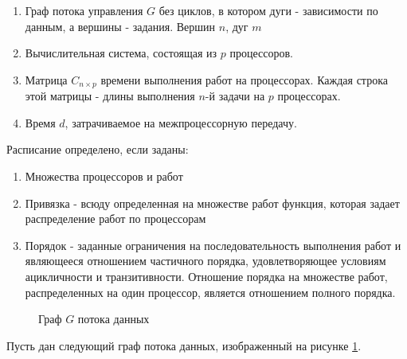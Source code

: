 \begin{enumerate}
    \item Граф потока управления $G$ без циклов, в котором дуги - зависимости по данным, а вершины - задания. Вершин $n$, дуг $m$
    \item Вычислительная система, состоящая из $p$ процессоров.
    \item Матрица $C_{n \times p}$ времени выполнения работ на процессорах. Каждая строка этой матрицы - длины выполнения $n$-й задачи на $p$ процессорах. 
    \item Время $d$, затрачиваемое на межпроцессорную передачу.
\end{enumerate}

Расписание определено, если заданы:
\begin{enumerate}
    \item Множества процессоров и работ
    \item Привязка - всюду определенная на множестве работ функция, которая задает распределение работ по процессорам
    \item Порядок - заданные ограничения на последовательность выполнения работ и являющееся отношением частичного порядка, удовлетворяющее условиям ацикличности и транзитивности. Отношение порядка на множестве работ, распределенных на один процессор, является отношением полного порядка.
\end{enumerate}

\begin{figure}[!htbp]
    \caption{Граф $G$ потока данных}
    \label{fig:DFG}
\end{figure}
Пусть дан следующий граф потока данных, изображенный на рисунке \ref{fig:DFG}.

